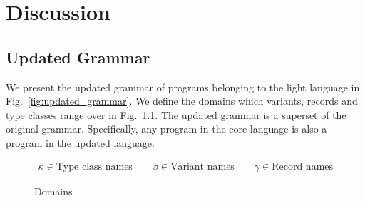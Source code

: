\chapter{Discussion}\label{sec:discussion}

\section{Updated Grammar}

We present the updated grammar of programs belonging to the light language in
Fig.~\ref{fig:updated_grammar}. We define the domains which variants, records
and type classes range over in Fig.~\ref{fig:domains}. The updated grammar is a
superset of the original grammar. Specifically, any program in the core
language is also a program in the updated language.

\begin{figure}[ht!]
\begin{align*}
         \kappa \in \text{Type class names}
  \qquad \beta  \in \text{Variant names}
  \qquad \gamma \in \text{Record names}
\end{align*}
\caption{Domains}\label{fig:domains}
\end{figure}

